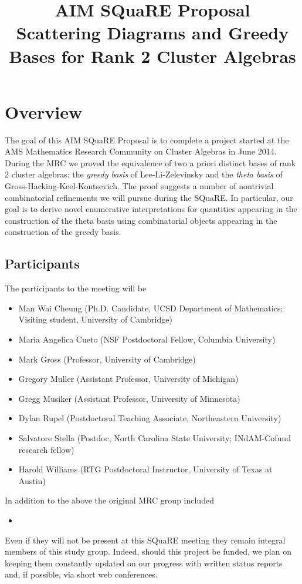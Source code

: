 \documentclass{amsart}
\title[\small{Scattering Diagrams and Greedy Bases for Rank 2 Cluster Algebras}]
  {AIM SQuaRE Proposal\\ 
  \small{Scattering Diagrams and Greedy Bases for Rank 2 Cluster Algebras}}
\begin{document}
  \maketitle
  
  \section*{Overview}
    The goal of this AIM SQuaRE Proposal is to complete a project started at the
    AMS Mathematics Research Community on Cluster Algebras in June 2014.
    During the MRC we proved the equivalence of two a priori distinct bases of
    rank 2 cluster algebras: the \emph{greedy basis} of Lee-Li-Zelevinsky and
    the \emph{theta basis} of Gross-Hacking-Keel-Kontsevich.
    The proof suggests a number of nontrivial combinatorial refinements we will
    pursue during the SQuaRE.
    In particular, our goal is to derive novel enumerative interpretations for
    quantities appearing in the construction of the theta basis using
    combinatorial objects appearing in the construction of the greedy basis.

  \subsection*{Participants}
    The participants to the meeting will be 
    \begin{itemize}
      \item Man Wai Cheung (Ph.D. Candidate, UCSD Department of Mathematics;
          Visiting student, University of Cambridge)
      \item Maria Angelica Cueto (NSF Postdoctoral Fellow, Columbia University)
      \item Mark Gross (Professor, University of Cambridge)
      \item Gregory Muller (Assistant Professor, University of Michigan)
      \item Gregg Musiker (Assistant Professor, University of Minnesota)
      \item Dylan Rupel (Postdoctoral Teaching Associate, Northeastern
          University)
      \item Salvatore Stella (Postdoc, North Carolina State University;
          INdAM-Cofund research fellow)
      \item Harold Williams (RTG Postdoctoral Instructor, University of 
          Texas at Austin) 
    \end{itemize}
    In addition to the above the original MRC group included
    \begin{itemize}
      \item
    \end{itemize}
    Even if they will not be present at this SQuaRE meeting they remain integral
    members of this study group. 
    Indeed, should this project be funded, we plan on keeping them constantly
    updated on our progress with written status reports and, if possible, via
    short web conferences.
  
\end{document}
